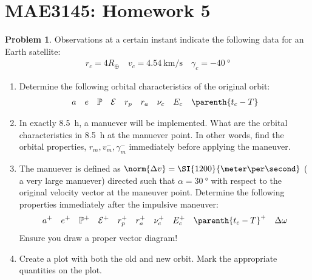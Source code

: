 \documentclass[10pt]{article}
\date{}
\theoremstyle{definition}
\newtheorem{prob}{Problem}[section]
\newenvironment{subprob}%
{\renewcommand{\theenumi}{\alph{enumi}}\renewcommand{\labelenumi}{(\theenumi)}\begin{enumerate}}%
{\end{enumerate}}%
\begin{document}
\setcounter{page}{1}
\pagestyle{plain}
\section*{MAE3145: Homework 5}
\vspace*{-0.4cm}

\begin{prob}
    Observations at a certain instant indicate the following data for an Earth satellite:
    \begin{align*}
        r_c = 4 R_{\oplus} \quad v_c = \SI{4.54}{\kilo\meter\per\second} \quad \gamma_c = \SI{-40}{\degree}
    \end{align*}
    
    \begin{subprob}
    \item Determine the following orbital characteristics of the original  orbit:
        \begin{align*}
        a \quad e \quad \mathbb{P} \quad \mathcal{E} \quad r_p \quad r_a \quad \nu_c \quad E_c \quad \parenth{t_c - T}
        \end{align*}
    \item In exactly \SI{8.5}{\hour}, a manuever will be implemented.
        What are the orbital characteristics in \SI{8.5}{\hour} at the manuever point. 
        In other words, find the orbital properties, \( r_m, v_m^{-}, \gamma_m^{-} \) immediately before applying the maneuver.
    \item The manuever is defined as \( \norm{\Delta v} = \SI{1200}{\meter\per\second} \) ( a very large manuever) directed such that \( \alpha = \SI{30}{\degree} \) with respect to the original velocity vector at the maneuver point.
        Determine the following properties immediately after the impulsive maneuver:
        \begin{align*}
            a^{+} \quad e^{+} \quad \mathbb{P}^{+} \quad \mathcal{E}^{+} \quad r_p^{+} \quad r_a^{+} \quad \nu_c^{+} \quad E_c^{+} \quad \parenth{t_c - T}^{+} \quad \Delta \omega
        \end{align*}
        Ensure you draw a proper vector diagram!
    \item Create a plot with both the old and new orbit. 
        Mark the appropriate quantities on the plot.

    \end{subprob}
\end{prob}
\end{document}
